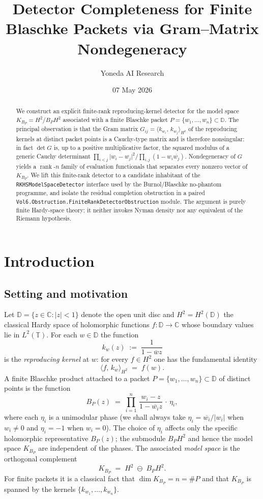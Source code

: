 \documentclass[12pt]{article}
\title{Detector Completeness for Finite Blaschke Packets via Gram--Matrix Nondegeneracy}
\author{Yoneda AI Research}
\date{07 May 2026}
\theoremstyle{definition}
\theoremstyle{remark}
\newcommand{\C}{\mathbb{C}}
\newcommand{\D}{\mathbb{D}}
\newcommand{\T}{\mathbb{T}}
\newcommand{\HHH}{H^{2}}
\newcommand{\KBP}{K_{B_{P}}}
\newcommand{\inner}[2]{\langle #1,\,#2\rangle}
\newcommand{\abs}[1]{\lvert #1 \rvert}
\newcommand{\conj}[1]{\overline{#1}}
\DeclareMathOperator{\rank}{rank}
\begin{document}
\maketitle

\begin{abstract}
We construct an explicit finite-rank reproducing-kernel detector for the
model space $\KBP=\HHH/B_{P}\HHH$ associated with a finite Blaschke packet
$P=\{w_{1},\dots,w_{n}\}\subset\D$. The principal observation is that the
Gram matrix $G_{ij}=\inner{k_{w_{i}}}{k_{w_{j}}}_{\HHH}$ of the
reproducing kernels at distinct packet points is a Cauchy-type matrix and
is therefore nonsingular: in fact $\det G$ is, up to a positive multiplicative
factor, the squared modulus of a generic Cauchy determinant
$\prod_{i<j}\abs{w_{i}-w_{j}}^{2}/\prod_{i,j}(1-w_{i}\conj{w_{j}})$.
Nondegeneracy of $G$ yields a $\rank$-$n$ family of evaluation functionals
that separates every nonzero vector of $\KBP$. We lift this finite-rank
detector to a candidate inhabitant of the
\texttt{RKHSModelSpaceDetector} interface used by the Burnol/Blaschke
no-phantom programme, and isolate the residual completion obstruction in
a paired \texttt{Vol6.Obstruction.FiniteRankDetectorObstruction} module.
The argument is purely finite Hardy-space theory: it neither invokes Nyman
density nor any equivalent of the Riemann hypothesis.
\end{abstract}

\tableofcontents

\section{Introduction}\label{sec:intro}

\subsection{Setting and motivation}

Let $\D=\{z\in\C:\abs{z}<1\}$ denote the open unit disc and $\HHH=\HHH(\D)$
the classical Hardy space of holomorphic functions $f:\D\to\C$ whose
boundary values lie in $L^{2}(\T)$. For each $w\in\D$ the function
\[
  k_{w}(z)\;:=\;\frac{1}{1-\conj{w}z}
\]
is the \emph{reproducing kernel} at $w$: for every $f\in\HHH$ one has the
fundamental identity
\[
  \inner{f}{k_{w}}_{\HHH}\;=\;f(w).
\]
A finite Blaschke product attached to a packet
$P=\{w_{1},\dots,w_{n}\}\subset\D$ of distinct points is the function
\[
  B_{P}(z)\;=\;\prod_{i=1}^{n}\,\frac{w_{i}-z}{1-\conj{w_{i}}z}\,\cdot\,\eta_{i},
\]
where each $\eta_{i}$ is a unimodular phase (we shall always take
$\eta_{i}=\conj{w_{i}}/\abs{w_{i}}$ when $w_{i}\neq0$ and $\eta_{i}=-1$
when $w_{i}=0$). The choice of $\eta_{i}$ affects only the specific
holomorphic representative $B_{P}(z)$; the submodule $B_{P}\HHH$ and
hence the model space $\KBP$ are independent of the phases.
The associated \emph{model space} is the orthogonal complement
\[
  \KBP\;=\;\HHH\;\ominus\;B_{P}\HHH.
\]
For finite packets it is a classical fact that
$\dim\KBP=n=\#P$ and that $\KBP$ is spanned by the kernels
$\{k_{w_{1}},\dots,k_{w_{n}}\}$.
\end{document}
